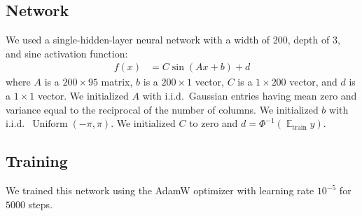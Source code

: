 \documentclass{article}
\DeclareMathOperator{\expect}{\mathbb{E}}
\begin{document}
\subsection{Network}
We used a single-hidden-layer neural network with a width of 200, depth of 3, and sine activation function:
\begin{align}
  f(x) &= C \sin(A x + b) + d
\end{align}
where \(A\) is a \(200 \times 95\) matrix, \(b\) is a \(200 \times 1\) vector, \(C\) is a \(1 \times 200\) vector, and \(d\) is a \(1 \times 1\) vector.
We initialized \(A\) with i.i.d.~Gaussian entries having mean zero and variance equal to the reciprocal of the number of columns.
We initialized \(b\) with i.i.d.~\(\operatorname{Uniform}(-\pi, \pi)\).
We initialized \(C\) to zero and \(d = \Phi^{-1}(\expect_\text{train} y)\).

\subsection{Training}
We trained this network using the AdamW optimizer \citep{loshchilov_decoupled_2019,deepmind_deepmind_2020} with learning rate \(10^{-5}\) for \(5000\) steps.



\clearpage
\end{document}
